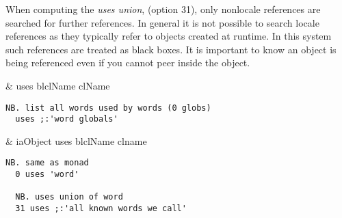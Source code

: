 When computing the \emph{uses union}, (option 31), only nonlocale references are searched for further references. In general it is not possible to search locale references as they typically refer to objects created at runtime. In this system such references are treated as black boxes. It is important to know an object is being referenced even if you cannot peer inside the object.

\begin{wordhead}
\monad & uses blclName \argsep clName \\
\end{wordhead}
\begin{lstlisting}[frame=single,framerule=0pt] 
  NB. list all words used by words (0 globs) 
  uses ;:'word globals' 
\end{lstlisting}    

\begin{wordhead}
\dyad & iaObject uses blclName \argsep clname \\
\end{wordhead}
\begin{lstlisting}[frame=single,framerule=0pt] 
  NB. same as monad
  0 uses 'word'  
  
  NB. uses union of word 
  31 uses ;:'all known words we call'   
\end{lstlisting}  